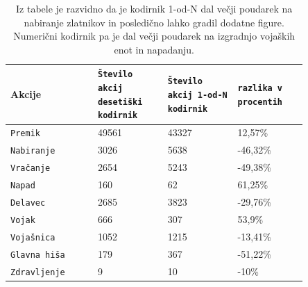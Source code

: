 \documentclass[a4paper, 12pt]{book}
\begin{document}
{%
\begin{table}
	\begin{center}
		\begin{tabular}{p{0.25\linewidth}|p{0.2\linewidth}|p{0.2\linewidth}|p{0.2\linewidth}}
			Akcije             & {\tt Število akcij desetiški kodirnik} & {\tt Število akcij 1-od-N kodirnik} & {\tt razlika v procentih}\\ \hline
			{\tt Premik}       & 49561                   & 43327                      & 12,57\%                                           \\
			{\tt Nabiranje}    & 3026                    & 5638                       & -46,32\%                                          \\
			{\tt Vračanje}     & 2654                    & 5243                       & -49,38\%                                          \\
			{\tt Napad}        & 160                     & 62                         & 61,25\%                                           \\
			{\tt Delavec}      & 2685                    & 3823                       & -29,76\%                                          \\
			{\tt Vojak}        & 666                     & 307                        &53,9\%                                             \\
			{\tt Vojašnica}    & 1052                    & 1215                       & -13,41\%                                          \\
			{\tt Glavna hiša}  & 179                     & 367                        & -51,22\%                                          \\
			{\tt Zdravljenje}  & 9                       & 10                         & -10\%                                             \\
		\end{tabular}
	\end{center}
	\caption{Iz tabele je razvidno da je kodirnik 1-od-N dal večji poudarek na nabiranje zlatnikov in posledično lahko gradil dodatne figure.
	Numerični kodirnik pa je dal večji poudarek na izgradnjo vojaških enot in napadanju.}
	\label{tableencoders}
\end{table}


}
\end{document}
